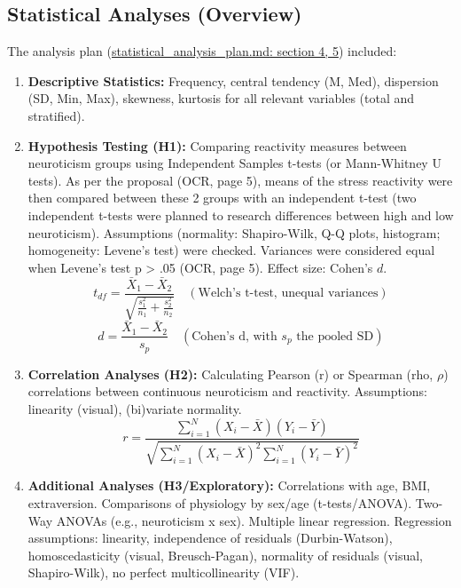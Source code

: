 \documentclass[11pt, a4paper]{report}
\newcommand{\mdcitesec}[2]{\href{run:./sources/#1}{\url{#1}: section #2}}
\begin{document}
\subsection{Statistical Analyses (Overview)}
\label{subsec:statistical_analyses_method} %
The analysis plan (\mdcitesec{statistical_analysis_plan.md}{4, 5}) included:
\begin{enumerate}
    \item \textbf{Descriptive Statistics:} Frequency, central tendency (M, Med), dispersion (SD, Min, Max), skewness, kurtosis for all relevant variables (total and stratified).
    \item \textbf{Hypothesis Testing (H1):} Comparing reactivity measures between neuroticism groups using Independent Samples t-tests (or Mann-Whitney U tests). As per the proposal \cite{ThesisTempPDF} (OCR, page 5), means of the stress reactivity were then compared between these 2 groups with an independent t-test (two independent t-tests were planned to research differences between high and low neuroticism). Assumptions (normality: Shapiro-Wilk, Q-Q plots, histogram; homogeneity: Levene's test) were checked. Variances were considered equal when Levene's test p > .05 \cite{ThesisTempPDF} (OCR, page 5). Effect size: Cohen's $d$.
        \begin{equation}
            t_{df} = \frac{\bar{X}_1 - \bar{X}_2}{\sqrt{\frac{s_1^2}{n_1} + \frac{s_2^2}{n_2}}} \quad (\text{Welch's t-test, unequal variances})
        \end{equation}
        \begin{equation}
            d = \frac{\bar{X}_1 - \bar{X}_2}{s_p} \quad (\text{Cohen's d, with } s_p \text{ the pooled SD})
        \end{equation}
    \item \textbf{Correlation Analyses (H2):} Calculating Pearson (r) or Spearman (rho, $\rho$) correlations between continuous neuroticism and reactivity. Assumptions: linearity (visual), (bi)variate normality.
        \begin{equation}
            r = \frac{\sum_{i=1}^{N} (X_i - \bar{X})(Y_i - \bar{Y})}{\sqrt{\sum_{i=1}^{N} (X_i - \bar{X})^2 \sum_{i=1}^{N} (Y_i - \bar{Y})^2}}
        \end{equation}
    \item \textbf{Additional Analyses (H3/Exploratory):} Correlations with age, BMI, extraversion. Comparisons of physiology by sex/age (t-tests/ANOVA). Two-Way ANOVAs (e.g., neuroticism x sex). Multiple linear regression. Regression assumptions: linearity, independence of residuals (Durbin-Watson), homoscedasticity (visual, Breusch-Pagan), normality of residuals (visual, Shapiro-Wilk), no perfect multicollinearity (VIF).

\end{enumerate}
\end{document}
